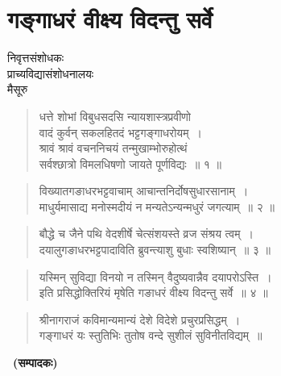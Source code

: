 \chapter{गङ्गाधरं वीक्ष्य विदन्तु सर्वे}

\begin{center}
\smallskip

निवृत्तसंशोधकः\\ 
प्राच्यविद्यासंशोधनालयः\\  
मैसूरु
\addrule
\end{center}

\begin{verse}
धत्ते शोभां विबुधसदसि न्यायशास्त्रप्रवीणो\\
वादं कुर्वन् सकलहितदं भट्टगङ्गाधरोयम्~।\\
श्रावं श्रावं वचननिचयं तन्मुखाम्भोरुहोत्थं\\
सर्वश्छात्रो विमलधिषणो जायते पूर्णविद्यः~॥ १ ॥
\end{verse}

\begin{verse}
विख्यातगङाधरभट्टवाचाम् आचान्तनिर्दोषसुधारसानाम्~।\\
माधुर्यमासाद्य मनोस्मदीयं न मन्यतेऽन्यन्मधुरं जगत्याम्~॥ २ ॥
\end{verse}

\begin{verse}
बौद्धे च जैने पथि वेदशीर्षे चेत्संशयस्ते व्रज संश्रय त्वम्~।\\
दयालुगङाधरभट्टपादाविति ब्रुवन्त्याशु बुधाः स्वशिष्यान्~॥ ३ ॥
\end{verse}

\begin{verse}
यस्मिन् सुविद्या विनयो न तस्मिन् वैदुष्यवान्नैव दयापरोऽस्ति~।\\
इति प्रसिद्धोक्तिरियं मृषेति गङाधरं वीक्ष्य विदन्तु सर्वे~॥ ४ ॥
\end{verse}

\begin{verse}
श्रीनागराजं कविमान्यमान्यं देशे विदेशे प्रचुरप्रसिद्धम्~।\\
गङ्गाधरं यः स्तुतिभिः तुतोष वन्दे सुशीलं सुविनीतविद्यम्~॥
\end{verse}

~\hfill\textbf{(सम्पादकः)}

\articleend
